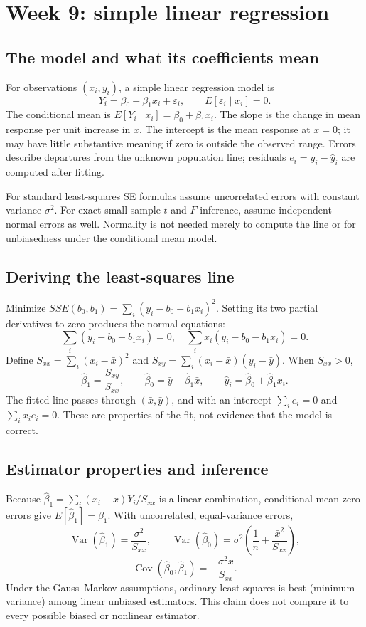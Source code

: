 \clearpage
\section{Week 9: simple linear regression}
\subsection{The model and what its coefficients mean}
For observations $(x_i,y_i)$, a simple linear regression model is
\[
Y_i=\beta_0+\beta_1x_i+\varepsilon_i,\qquad E[\varepsilon_i\mid x_i]=0.
\]
The conditional mean is $E[Y_i\mid x_i]=\beta_0+\beta_1x_i$. The slope is
the change in mean response per unit increase in $x$. The intercept is
the mean response at $x=0$; it may have little substantive meaning if zero
is outside the observed range. Errors describe departures from the unknown
population line; residuals $e_i=y_i-\hat y_i$ are computed after fitting.

For standard least-squares SE formulas assume uncorrelated errors with
constant variance $\sigma^2$. For exact small-sample $t$ and $F$ inference,
assume independent normal errors as well. Normality is not needed merely
to compute the line or for unbiasedness under the conditional mean model.

\subsection{Deriving the least-squares line}
Minimize $SSE(b_0,b_1)=\sum_i(y_i-b_0-b_1x_i)^2$.
Setting its two partial derivatives to zero produces the normal equations:
\[
\sum_i(y_i-b_0-b_1x_i)=0,\quad
\sum_i x_i(y_i-b_0-b_1x_i)=0.
\]
Define $S_{xx}=\sum_i(x_i-\bar x)^2$ and
$S_{xy}=\sum_i(x_i-\bar x)(y_i-\bar y)$. When $S_{xx}>0$,
\[
\hat\beta_1=\frac{S_{xy}}{S_{xx}},\qquad
\hat\beta_0=\bar y-\hat\beta_1\bar x,\qquad
\hat y_i=\hat\beta_0+\hat\beta_1x_i.
\]
The fitted line passes through $(\bar x,\bar y)$, and with an intercept
$\sum_i e_i=0$ and $\sum_i x_i e_i=0$. These are properties of the fit,
not evidence that the model is correct.

\subsection{Estimator properties and inference}
Because $\hat\beta_1=\sum_i(x_i-\bar x)Y_i/S_{xx}$ is a linear combination,
conditional mean zero errors give $E[\hat\beta_1]=\beta_1$. With uncorrelated,
equal-variance errors,
\[
\operatorname{Var}(\hat\beta_1)=\frac{\sigma^2}{S_{xx}},\qquad
\operatorname{Var}(\hat\beta_0)=\sigma^2\left(\frac1n+\frac{\bar x^2}{S_{xx}}\right),
\]
\[
\operatorname{Cov}(\hat\beta_0,\hat\beta_1)=-\frac{\sigma^2\bar x}{S_{xx}}.
\]
Under the Gauss--Markov assumptions, ordinary least squares is best
(minimum variance) among linear unbiased estimators. This claim does not
compare it to every possible biased or nonlinear estimator.

